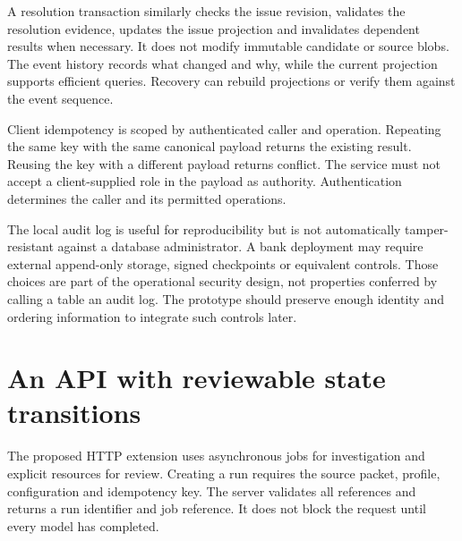 
A resolution transaction similarly checks the issue revision, validates the
resolution evidence, updates the issue projection and invalidates dependent
results when necessary. It does not modify immutable candidate or source blobs.
The event history records what changed and why, while the current projection
supports efficient queries. Recovery can rebuild projections or verify them
against the event sequence.

Client idempotency is scoped by authenticated caller and operation. Repeating the
same key with the same canonical payload returns the existing result. Reusing the
key with a different payload returns conflict. The service must not accept a
client-supplied role in the payload as authority. Authentication determines the
caller and its permitted operations.

The local audit log is useful for reproducibility but is not automatically
 tamper-resistant against a database administrator. A bank deployment may require
external append-only storage, signed checkpoints or equivalent controls. Those
choices are part of the operational security design, not properties conferred by
calling a table an audit log. The prototype should preserve enough identity and
ordering information to integrate such controls later.

\section{An API with reviewable state transitions}
\label{merge:M08:07}


The proposed HTTP extension uses asynchronous jobs for investigation and explicit
resources for review. Creating a run requires the source packet, profile,
configuration and idempotency key. The server validates all references and returns
a run identifier and job reference. It does not block the request until every
model has completed.

